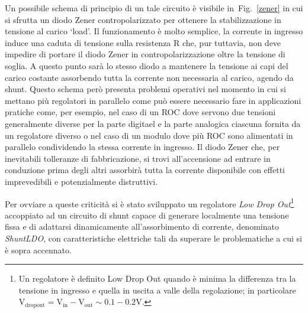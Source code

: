 Un possibile schema di principio di un tale circuito \`e visibile in~Fig.~\ref{zener} in cui si sfrutta un diodo Zener contropolarizzato per ottenere la stabilizzazione in tensione al carico `load'. Il funzionamento è molto semplice, la corrente in ingresso induce una caduta di tensione sulla resistenza R che, pur tuttavia, non deve impedire di portare il diodo Zener in contropolarizzazione oltre la tensione di soglia. A questo punto sarà lo stesso diodo a mantenere la tensione ai capi del carico costante assorbendo tutta la corrente non necessaria al carico, agendo da shunt. 
Questo schema però presenta problemi operativi nel momento in cui si mettano più regolatori in parallelo come pu\`o essere necessario fare in applicazioni pratiche come, per esempio, nel caso di un ROC dove servono due tensioni generalmente diverse per la parte digitael e la parte analogica ciascuna fornita da un regolatore diverso o nel caso di un modulo dove pi\`u ROC sono alimentati in parallelo condividendo la stessa corrente in ingresso. Il diodo Zener che, per inevitabili tolleranze di fabbricazione, si trovi all'accensione ad entrare in conduzione prima degli altri assorbir\`a tutta la corrente disponibile con effetti imprevedibili e potenzialmente distruttivi. 

Per ovviare a queste criticità si è stato sviluppato un regolatore \textit{Low Drop Out}\footnote{Un regolatore è definito Low Drop Out quando \`e minima la differenza tra la tensione in ingresso e quella in uscita a valle della regolazione; in particolare$\mathrm{V_{dropout}=V_{in}-V_{out}\sim 0.1-0.2 V}$.} accoppiato ad un circuito di shunt capace di generare localmente una tensione fissa e di adattarsi dinamicamente all'assorbimento di corrente, denominato {\em ShuntLDO}, con caratteristiche elettriche tali da superare le problematiche a cui si \`e sopra accennato.

